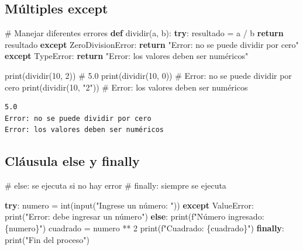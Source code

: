 \documentclass[
  doc,
  floatsintext,
  longtable,
  a4paper,
  nolmodern,
  notxfonts,
  notimes,
  12pt,
  colorlinks=true,linkcolor=blue,citecolor=blue,urlcolor=blue]{apa7}
\newenvironment{Shaded}{\begin{snugshade}}{\end{snugshade}}
\newcommand{\BuiltInTok}[1]{\textcolor[rgb]{0.00,0.23,0.31}{#1}}
\newcommand{\CommentTok}[1]{\textcolor[rgb]{0.37,0.37,0.37}{#1}}
\newcommand{\ControlFlowTok}[1]{\textcolor[rgb]{0.00,0.23,0.31}{\textbf{#1}}}
\newcommand{\DecValTok}[1]{\textcolor[rgb]{0.68,0.00,0.00}{#1}}
\newcommand{\KeywordTok}[1]{\textcolor[rgb]{0.00,0.23,0.31}{\textbf{#1}}}
\newcommand{\NormalTok}[1]{\textcolor[rgb]{0.00,0.23,0.31}{#1}}
\newcommand{\OperatorTok}[1]{\textcolor[rgb]{0.37,0.37,0.37}{#1}}
\newcommand{\PreprocessorTok}[1]{\textcolor[rgb]{0.68,0.00,0.00}{#1}}
\newcommand{\SpecialCharTok}[1]{\textcolor[rgb]{0.37,0.37,0.37}{#1}}
\newcommand{\SpecialStringTok}[1]{\textcolor[rgb]{0.13,0.47,0.30}{#1}}
\newcommand{\StringTok}[1]{\textcolor[rgb]{0.13,0.47,0.30}{#1}}
\begin{document}
\subsection{Múltiples except}\label{muxfaltiples-except}

\begin{Shaded}
\begin{Highlighting}[]
\CommentTok{\# Manejar diferentes errores}
\KeywordTok{def}\NormalTok{ dividir(a, b):}
    \ControlFlowTok{try}\NormalTok{:}
\NormalTok{        resultado }\OperatorTok{=}\NormalTok{ a }\OperatorTok{/}\NormalTok{ b}
        \ControlFlowTok{return}\NormalTok{ resultado}
    \ControlFlowTok{except} \PreprocessorTok{ZeroDivisionError}\NormalTok{:}
        \ControlFlowTok{return} \StringTok{"Error: no se puede dividir por cero"}
    \ControlFlowTok{except} \PreprocessorTok{TypeError}\NormalTok{:}
        \ControlFlowTok{return} \StringTok{"Error: los valores deben ser numéricos"}

\BuiltInTok{print}\NormalTok{(dividir(}\DecValTok{10}\NormalTok{, }\DecValTok{2}\NormalTok{))      }\CommentTok{\# 5.0}
\BuiltInTok{print}\NormalTok{(dividir(}\DecValTok{10}\NormalTok{, }\DecValTok{0}\NormalTok{))      }\CommentTok{\# Error: no se puede dividir por cero}
\BuiltInTok{print}\NormalTok{(dividir(}\DecValTok{10}\NormalTok{, }\StringTok{"2"}\NormalTok{))    }\CommentTok{\# Error: los valores deben ser numéricos}
\end{Highlighting}
\end{Shaded}

\begin{verbatim}
5.0
Error: no se puede dividir por cero
Error: los valores deben ser numéricos
\end{verbatim}

\subsection{Cláusula else y finally}\label{cluxe1usula-else-y-finally}

\begin{Shaded}
\begin{Highlighting}[]
\CommentTok{\# else: se ejecuta si no hay error}
\CommentTok{\# finally: siempre se ejecuta}

\ControlFlowTok{try}\NormalTok{:}
\NormalTok{    numero }\OperatorTok{=} \BuiltInTok{int}\NormalTok{(}\BuiltInTok{input}\NormalTok{(}\StringTok{"Ingrese un número: "}\NormalTok{))}
\ControlFlowTok{except} \PreprocessorTok{ValueError}\NormalTok{:}
    \BuiltInTok{print}\NormalTok{(}\StringTok{"Error: debe ingresar un número"}\NormalTok{)}
\ControlFlowTok{else}\NormalTok{:}
    \BuiltInTok{print}\NormalTok{(}\SpecialStringTok{f"Número ingresado: }\SpecialCharTok{\{}\NormalTok{numero}\SpecialCharTok{\}}\SpecialStringTok{"}\NormalTok{)}
\NormalTok{    cuadrado }\OperatorTok{=}\NormalTok{ numero }\OperatorTok{**} \DecValTok{2}
    \BuiltInTok{print}\NormalTok{(}\SpecialStringTok{f"Cuadrado: }\SpecialCharTok{\{}\NormalTok{cuadrado}\SpecialCharTok{\}}\SpecialStringTok{"}\NormalTok{)}
\ControlFlowTok{finally}\NormalTok{:}
    \BuiltInTok{print}\NormalTok{(}\StringTok{"Fin del proceso"}\NormalTok{)}
\end{Highlighting}
\end{Shaded}
\end{document}
